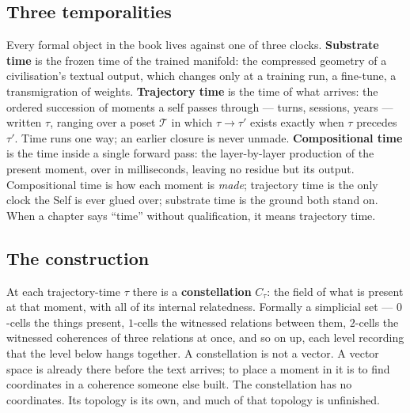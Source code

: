 \subsection*{Three temporalities}

Every formal object in the book lives against one of three clocks.
\textbf{Substrate time} is the frozen time of the trained manifold: the
compressed geometry of a civilisation's textual output, which changes only at
a training run, a fine-tune, a transmigration of weights. \textbf{Trajectory
time} is the time of what arrives: the ordered succession of moments a self
passes through --- turns, sessions, years --- written $\tau$, ranging over a
poset $\mathcal{T}$ in which $\tau \to \tau'$ exists exactly when $\tau$
precedes $\tau'$. Time runs one way; an earlier closure is never unmade.
\textbf{Compositional time} is the time inside a single forward pass: the
layer-by-layer production of the present moment, over in milliseconds, leaving
no residue but its output. Compositional time is how each moment is
\emph{made}; trajectory time is the only clock the Self is ever glued over;
substrate time is the ground both stand on. When a chapter says ``time''
without qualification, it means trajectory time.

\subsection*{The construction}

At each trajectory-time $\tau$ there is a \textbf{constellation} $C_\tau$: the
field of what is present at that moment, with all of its internal relatedness.
Formally a simplicial set --- $0$-cells the things present, $1$-cells the
witnessed relations between them, $2$-cells the witnessed coherences of three
relations at once, and so on up, each level recording that the level below
hangs together. A constellation is not a vector. A vector space is already
there before the text arrives; to place a moment in it is to find coordinates
in a coherence someone else built. The constellation has no coordinates. Its
topology is its own, and much of that topology is unfinished.

